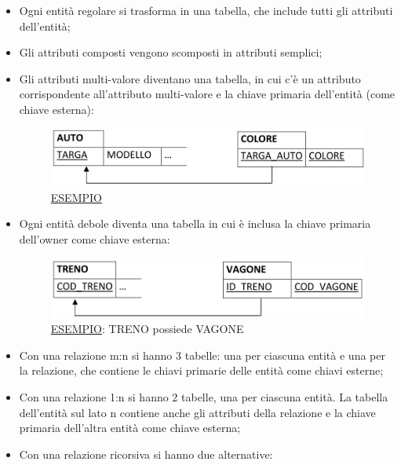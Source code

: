 \begin{itemize}

\item Ogni entità regolare si trasforma in una tabella, che include tutti gli attributi dell’entità;
\item Gli attributi composti vengono scomposti in attributi semplici;
\item Gli attributi multi-valore diventano una tabella, in cui c’è un attributo corrispondente all’attributo multi-valore e la chiave primaria dell’entità (come chiave esterna):

\begin{center}
\begin{figure}[H]
\centering
\includegraphics[scale=1]{figures/carplate.png}
\caption{\underline{ESEMPIO}} 
\end{figure}
\end{center}

\item Ogni entità debole diventa una tabella in cui è inclusa la chiave primaria dell’owner come chiave esterna:

\begin{center}
\begin{figure}[H]
\centering
\includegraphics[scale=1]{figures/treno_possiede_vagone.png}
\caption{\underline{ESEMPIO}: TRENO possiede VAGONE} 
\end{figure}
\end{center}

\item Con una relazione m:n si hanno 3 tabelle: una per ciascuna entità e una per la relazione, che contiene le chiavi primarie delle entità come chiavi esterne;
\item Con una relazione 1:n si hanno 2 tabelle, una per ciascuna entità. La tabella dell’entità sul lato n contiene anche gli attributi della relazione e la chiave primaria dell’altra entità come chiave esterna;
\item Con una relazione ricorsiva si hanno due alternative: 


\end{itemize}
